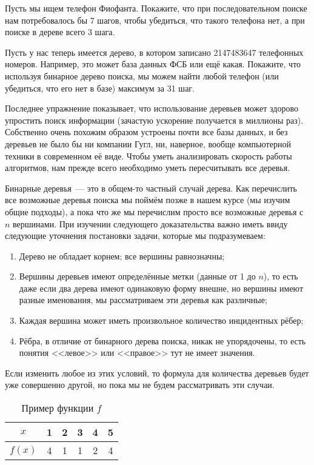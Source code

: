 \begin{exercise}
Пусть мы ищем телефон Фиофанта. Покажите, что при последовательном поиске нам потребовалось бы 7 шагов, чтобы убедиться, что такого телефона нет, а при поиске  в дереве всего 3 шага.
\end{exercise}

\begin{exercise}
Пусть у нас теперь имеется дерево, в котором записано 2147483647 телефонных номеров. Например, это может база данных ФСБ или ещё какая. Покажите, что используя бинарное дерево поиска, мы можем найти любой телефон (или убедиться, что его нет в базе) максимум за 31 шаг.
\end{exercise}

Последнее упражнение показывает, что использование деревьев может здорово упростить поиск информации (зачастую ускорение получается в миллионы раз). Собственно очень похожим образом устроены почти все базы данных, и без деревьев не было бы ни компании Гугл, ни, наверное, вообще компьютерной техники в современном её виде. Чтобы уметь анализировать скорость работы алгоритмов, нам прежде всего необходимо уметь пересчитывать все деревья.

Бинарные деревья~--- это в общем-то частный случай дерева. Как перечислить все возможные деревья поиска мы поймём позже в нашем курсе (мы изучим общие подходы), а пока что же мы перечислим  просто все возможные деревья с $n$ вершинами. При изучении следующего доказательства важно иметь ввиду следующие уточнения постановки задачи, которые мы подразумеваем:
\begin{enumerate}
\item Дерево не обладает корнем; все вершины равнозначны;
\item Вершины деревьев имеют определённые метки (данные от 1 до $n$), то есть даже если два дерева имеют одинаковую форму внешне, но вершины имеют разные именования, мы рассматриваем эти деревья как различные;
\item Каждая вершина может иметь произвольное количество инцидентных рёбер;
\item Рёбра, в отличие от бинарного дерева поиска, никак не упорядочены, то есть понятия <<левое>> или <<правое>> тут не имеет значения.
\end{enumerate}

Если изменить любое из этих условий, то формула для количества деревьев будет уже совершенно другой, но пока мы не будем рассматривать эти случаи.

\begin{table}[h]
\centering
\begin{tabular}{c|ccccc}
$x$ & 1 & 2 & 3 & 4 & 5 \\
\hline
$f(x)$ & 4 & 1 & 1 & 2 & 4
\end{tabular}
\caption{Пример функции $f$}
\end{table}

